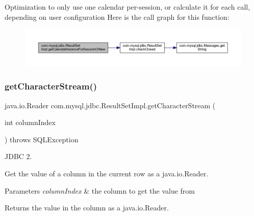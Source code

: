 Optimization to only use one calendar per-\/session, or calculate it for each call, depending on user configuration Here is the call graph for this function\+:
\nopagebreak
\begin{figure}[H]
\begin{center}
\leavevmode
\includegraphics[width=350pt]{classcom_1_1mysql_1_1jdbc_1_1_result_set_impl_a11c9733e6a1c56774441465dbf40ed58_cgraph}
\end{center}
\end{figure}
\mbox{\label{classcom_1_1mysql_1_1jdbc_1_1_result_set_impl_a941ea1683438a62fca25a1553e10e6e4}} 
\subsubsection{\texorpdfstring{get\+Character\+Stream()}{getCharacterStream()}\hspace{0.1cm}{\footnotesize\ttfamily [1/2]}}
{\footnotesize\ttfamily java.\+io.\+Reader com.\+mysql.\+jdbc.\+Result\+Set\+Impl.\+get\+Character\+Stream (\begin{DoxyParamCaption}\item[{int}]{column\+Index }\end{DoxyParamCaption}) throws S\+Q\+L\+Exception}

J\+D\+BC 2.

Get the value of a column in the current row as a java.\+io.\+Reader. 


\begin{DoxyParams}{Parameters}
{\em column\+Index} & the column to get the value from\\
\hline
\end{DoxyParams}
\begin{DoxyReturn}{Returns}
the value in the column as a java.\+io.\+Reader.
\end{DoxyReturn}

